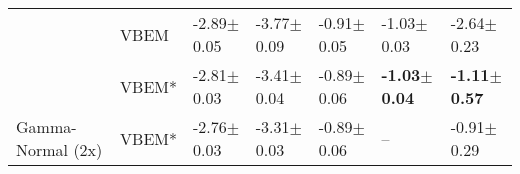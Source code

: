 \begin{tabular}{lllllll}
                  & VBEM &           -2.89$\pm$0.05 &           -3.77$\pm$0.09 &           -0.91$\pm$0.05 &           -1.03$\pm$0.03 &           -2.64$\pm$0.23 \\
                  & VBEM* &           -2.81$\pm$0.03 &           -3.41$\pm$0.04 &           -0.89$\pm$0.06 &  \textbf{-1.03$\pm$0.04} &  \textbf{-1.11$\pm$0.57} \\
Gamma-Normal (2x) & VBEM* &           -2.76$\pm$0.03 &           -3.31$\pm$0.03 &           -0.89$\pm$0.06 &                      -- &           -0.91$\pm$0.29 \\
\bottomrule
\end{tabular}

